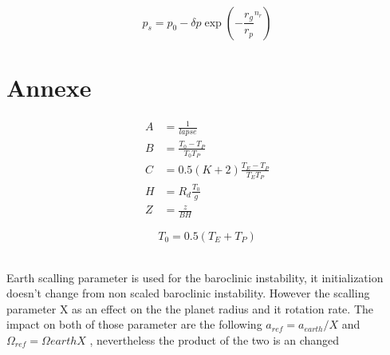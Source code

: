 \documentclass{article}
\begin{document}
~\\ 

\begin{equation}
p_s=p_0-\delta p \exp(-\frac{r_g}{r_p}^{n_r})
\end{equation}


\clearpage 
\appendix
\section{Annexe}

\begin{align*}
A&= \frac{1}{lapse} \\
B&=\frac{T_0-T_P}{T_0T_P} \\
C&=0.5(K+2) \frac{T_E-T_P}{T_ET_P} \\
H&=R_d\frac{T_0} {g}\\
Z&=\frac{z}{B H}  
\end{align*}


\begin{equation*}
T_0=0.5(T_E +T_P)
\end{equation*}

~\\Earth scalling parameter is used for the baroclinic instability, it initialization doesn't change from non scaled baroclinic instability. However the scalling parameter X as an effect on the the planet radius and it rotation rate. The impact on both of those parameter are the following $a_{ref}=a_{earth}/X$ and $\Omega_{ref}=\Omega{earth}X$ , nevertheless the product of the two is an changed 
\end{document}

